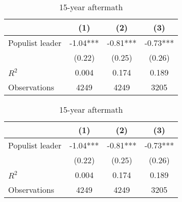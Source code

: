 \begin{table}[htbp]\centering
\def\sym#1{\ifmmode^{#1}\else\(^{#1}\)\fi}
\caption{15-year aftermath}
\begin{tabular}{l*{3}{c}}
\hline\hline
                    &\multicolumn{1}{c}{(1)}   &\multicolumn{1}{c}{(2)}   &\multicolumn{1}{c}{(3)}   \\
\hline
Populist leader     &       -1.04***&       -0.81***&       -0.73***\\
                    &      (0.22)   &      (0.25)   &      (0.26)   \\
\hline
\(R^{2}\)           &       0.004   &       0.174   &       0.189   \\
Observations        &        4249   &        4249   &        3205   \\
\hline\hline
\end{tabular}
\end{table}
\begin{table}[htbp]\centering
\def\sym#1{\ifmmode^{#1}\else\(^{#1}\)\fi}
\caption{15-year aftermath}
\begin{tabular}{l*{3}{c}}
\hline\hline
                    &\multicolumn{1}{c}{(1)}   &\multicolumn{1}{c}{(2)}   &\multicolumn{1}{c}{(3)}   \\
\hline
Populist leader     &       -1.04***&       -0.81***&       -0.73***\\
                    &      (0.22)   &      (0.25)   &      (0.26)   \\
\hline
\(R^{2}\)           &       0.004   &       0.174   &       0.189   \\
Observations        &        4249   &        4249   &        3205   \\
\hline\hline
\end{tabular}
\end{table}

